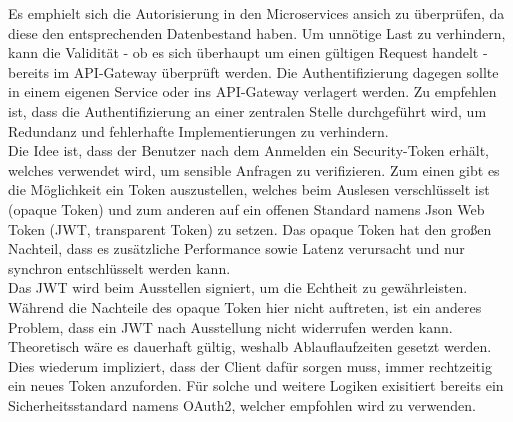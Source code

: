 Es emphielt sich die Autorisierung in den Microservices ansich zu überprüfen, da diese den entsprechenden Datenbestand haben. Um unnötige Last zu verhindern, kann die Validität - ob es sich überhaupt um einen gültigen Request handelt - bereits im API-Gateway überprüft werden. Die Authentifizierung dagegen sollte in einem eigenen Service oder ins API-Gateway verlagert werden.\cite{rewe2019mic_ppp}\cite{richardson2019mic_pattern} Zu empfehlen ist, dass die Authentifizierung an einer zentralen Stelle durchgeführt wird, um Redundanz und fehlerhafte Implementierungen zu verhindern. \\

%

Die Idee ist, dass der Benutzer nach dem Anmelden ein Security-Token erhält, welches verwendet wird, um sensible Anfragen zu verifizieren. Zum einen gibt es die Möglichkeit ein Token auszustellen, welches beim Auslesen verschlüsselt ist (opaque Token) und zum anderen auf ein offenen Standard namens Json Web Token (JWT, transparent Token) zu setzen. Das opaque Token hat den großen Nachteil, dass es zusätzliche Performance sowie Latenz verursacht und nur synchron entschlüsselt werden kann.\cite{richardson2019mic_pattern} \\

Das JWT wird beim Ausstellen signiert, um die Echtheit zu gewährleisten. Während die Nachteile des opaque Token hier nicht auftreten, ist ein anderes Problem, dass ein JWT nach Ausstellung nicht widerrufen werden kann. Theoretisch wäre es dauerhaft gültig, weshalb Ablauflaufzeiten gesetzt werden. Dies wiederum impliziert, dass der Client dafür sorgen muss, immer rechtzeitig ein neues Token anzuforden. Für solche und weitere Logiken exisitiert bereits ein Sicherheitsstandard namens OAuth2, welcher empfohlen wird zu verwenden.\cite{richardson2019mic_pattern} \\


